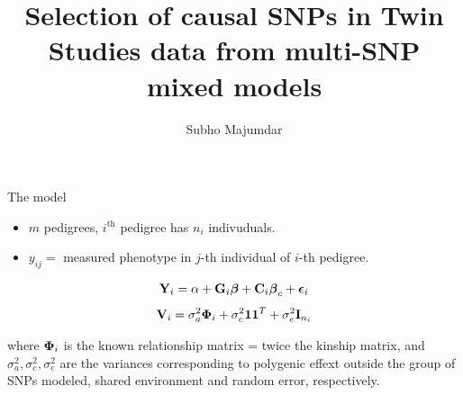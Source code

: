 \documentclass[handout,10pt]{beamer}
\title[Your Short Title]{Selection of causal SNPs in Twin Studies data from multi-SNP mixed models}
\author{Subho Majumdar}
\begin{document}
\begin{frame}
  \titlepage
\end{frame}


%
%

\begin{frame}{The model}

\begin{itemize}
\item $m$ pedigrees, $i^\text{th}$ pedigree has $n_i$ indivuduals.
\item $y_{ij} = $ measured phenotype in $j$-th individual of $i$-th pedigree.

\end{itemize}

%
\begin{align}\label{eqn:LMMeqn}
{\mathbf{Y}}_i = \alpha + {\mathbf{G}}_i {\boldsymbol{\beta}} + {\mathbf{C}}_i {\boldsymbol{\beta}}_c + {\boldsymbol{\epsilon}}_i
\end{align}
%
%
\begin{align}\label{eqn:partsOfV}
{\mathbf{V}}_i = \sigma_a^2 {\boldsymbol{\Phi}}_i + \sigma_c^2 {\bf 1} {\bf 1}^T + \sigma_e^2 {\mathbf{I}}_{n_i}
\end{align}
%

where ${\boldsymbol{\Phi}}_i$ is the known relationship matrix = twice the kinship matrix, and $\sigma_a^2, \sigma_c^2, \sigma_e^2$ are the variances corresponding to polygenic effext outside the group of SNPs modeled, shared environment and random error, respectively.
\end{frame}
\end{document}
